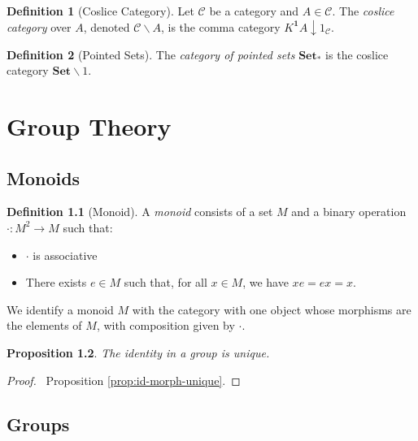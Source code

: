 \documentclass{book}
\newtheorem{prop}{Proposition}[chapter]
\theoremstyle{definition}
\newtheorem{df}[prop]{Definition}
\newcommand{\Set}{\ensuremath{\mathbf{Set}}}
\begin{document}
\begin{df}[Coslice Category]
    Let $\mathcal{C}$ be a category and $A \in \mathcal{C}$. The \emph{coslice category} over $A$, denoted $\mathcal{C} \backslash A$, is the comma category $K^{\mathbf{1}} A \downarrow 1_\mathcal{C}$.
\end{df}

\begin{df}[Pointed Sets]
    The \emph{category of pointed sets} $\Set_*$ is the coslice category $\Set \backslash 1$.
\end{df}

\part{Group Theory}

\chapter{Monoids}

\begin{df}[Monoid]
A \emph{monoid} consists of a set $M$ and a binary operation $\cdot : M^2 \rightarrow M$ such that:
\begin{itemize}
\item $\cdot$ is associative
\item There exists $e \in M$ such that, for all $x \in M$, we have $x e = ex = x$.
\end{itemize}

We identify a monoid $M$ with the category with one object whose morphisms are the elements of $M$, with composition given by $\cdot$.
\end{df}

\begin{prop}
    The identity in a group is unique.
\end{prop}

\begin{proof}
    \pf\ Proposition \ref{prop:id-morph-unique}.
\end{proof}

\chapter{Groups}
\end{document}
